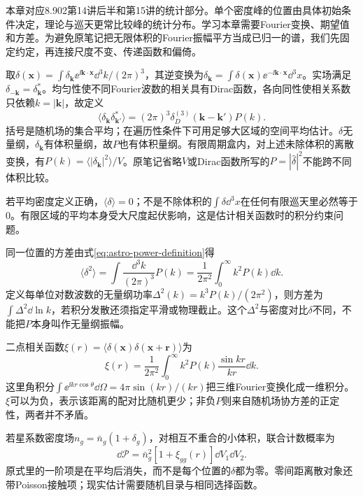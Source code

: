 本章对应8.902第14讲后半和第15讲的统计部分。单个密度峰的位置由具体初始条件决定，理论与巡天更常比较峰的统计分布。学习本章需要Fourier变换、期望值和方差。为避免原笔记把无限体积的Fourier振幅平方当成已归一的谱，我们先固定约定，再连接尺度不变、传递函数和偏倚。

取$\delta(\mathbf x)=\int\delta_{\mathbf k}\ee^{\ii\mathbf k\cdot\mathbf x}\dd^3k/(2\pi)^3$，其逆变换为$\delta_{\mathbf k}=\int\delta(\mathbf x)\ee^{-\ii\mathbf k\cdot\mathbf x}\dd^3x$。实场满足$\delta_{-\mathbf k}=\delta_{\mathbf k}^*$。均匀性使不同Fourier波数的相关具有Dirac函数，各向同性使相关系数只依赖$k=|\mathbf k|$，故定义
\begin{equation}\label{eq:astro-power-definition}
 \langle\delta_{\mathbf k}\delta_{\mathbf k'}^*\rangle
 =(2\pi)^3\delta_D^{(3)}(\mathbf k-\mathbf k')P(k).
\end{equation}
括号是随机场的集合平均；在遍历性条件下可用足够大区域的空间平均估计。$\delta$无量纲，$\delta_{\mathbf k}$有体积量纲，故$P$也有体积量纲。有限周期盒内，对上述未除体积的离散变换，有$P(k)=\langle|\delta_{\mathbf k}|^2\rangle/V$。原笔记省略$V$或Dirac函数所写的$P=|\hat\delta|^2$不能跨不同体积比较。

若平均密度定义正确，$\langle\delta\rangle=0$；不是不除体积的$\int\delta\dd^3x$在任何有限巡天里必然等于0。有限区域的平均本身受大尺度起伏影响，这是估计相关函数时的积分约束问题。

同一位置的方差由式\eqref{eq:astro-power-definition}得
\[
 \langle\delta^2\rangle=\int\frac{\dd^3k}{(2\pi)^3}P(k)
 =\frac1{2\pi^2}\int_0^\infty k^2P(k)\dd k.
\]
定义每单位对数波数的无量纲功率$\Delta^2(k)=k^3P(k)/(2\pi^2)$，则方差为$\int\Delta^2\dd\ln k$，若积分发散还须指定平滑或物理截止。这个$\Delta^2$与密度对比$\delta$不同，不能把$P$本身叫作无量纲振幅。

二点相关函数$\xi(r)=\langle\delta(\mathbf x)\delta(\mathbf x+\mathbf r)\rangle$为
\begin{equation}\label{eq:astro-correlation}
 \xi(r)=\frac1{2\pi^2}\int_0^\infty k^2P(k)\frac{\sin kr}{kr}\dd k.
\end{equation}
这里角积分$\int\ee^{\ii kr\cos\theta}\dd\Omega=4\pi\sin(kr)/(kr)$把三维Fourier变换化成一维积分。$\xi$可以为负，表示该距离的配对比随机更少；非负$P$则来自随机场协方差的正定性，两者并不矛盾。

若星系数密度场$n_g=\bar n_g(1+\delta_g)$，对相互不重合的小体积，联合计数概率为
\[
 \dd\mathcal P=\bar n_g^2[1+\xi_{gg}(r)]\dd V_1\dd V_2.
\]
原式里的一阶项是在平均后消失，而不是每个位置的$\delta$都为零。零间距离散对象还带Poisson接触项；现实估计需要随机目录与相同选择函数。

